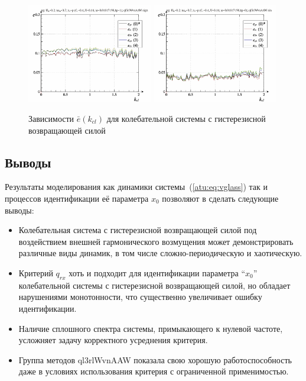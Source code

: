 \begin{figure}[ht!]
\begin{center}
  \includegraphics[width=0.49\textwidth]{p/cha/vg/vg_id-p_k_cl_sign.png}
  \hfill
  \includegraphics[width=0.49\textwidth]{p/cha/vg/vg_id-p_k_cl_sin.png}
\end{center}
  \caption{Зависимости $\bar{e}(k_{cl})$ для колебательной системы с гистерезисной возвращающей силой}
\label{atu:f:vg_e_k_cl}
\end{figure}





\subsection{Выводы}  %

Результаты моделирования
как динамики системы~(\ref{atu:eq:vglass})
так и процессов идентификации её параметра $x_0$
позволяют в сделать следующие выводы:

\begin{itemize}

  \item
    Колебательная система с гистерезисной возвращающей силой
    под воздействием внешней гармонического возмущения
    может демонстрировать различные виды динамик, в
    том числе сложно-периодическую и хаотическую.


  \item
    Критерий $q_{rx}$ хоть и подходит для идентификации параметра ``$x_0$''
    колебательной системы с гистерезисной возвращающей силой,
    но обладает нарушениями монотонности,
    что существенно увеличивает ошибку идентификации.

  \item
    Наличие сплошного спектра системы, примыкающего к нулевой частоте,
    усложняет задачу корректного усреднения критерия.

  \item
    Группа методов ql3rlWvnAAW показала свою хорошую работоспособность
    даже в условиях использования критерия с ограниченной применимостью.


\end{itemize}


